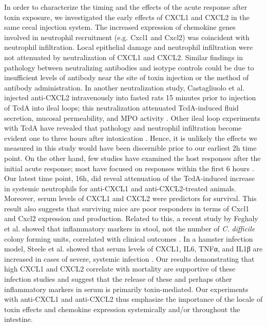 In order to characterize the timing and the effects of the 
acute response after toxin exposure, we investigated the 
early effects of CXCL1 and CXCL2 in the same cecal injection 
system. The increased expression of chemokine genes involved 
in neutrophil recruitment (e.g. Cxcl1 and Cxcl2) was 
coincident with neutrophil infiltration. Local epithelial 
damage and neutrophil infiltration were not attenuated by 
neutralization of CXCL1 and CXCL2. Similar findings in 
pathology between neutralizing antibodies and isotype controls 
could be due to insufficient levels of antibody near the 
site of toxin injection or the method of antibody administration. 
In another neutralization study, Castagliuolo et al. injected 
anti-CXCL2 intravenously into fasted rats 15 minutes prior to 
injection of TcdA into ileal loops; this neutralization attenuated 
TcdA-induced fluid secretion, mucosal permeability, and MPO 
activity \cite{Castagliuolo:1998um}. Other ileal loop experiments 
with TcdA have revealed that pathology and neutrophil infiltration 
become evident one to three hours after intoxication 
\cite{Ishida:2004ta,Castagliuolo:1998um}. Hence, it is unlikely the 
effects we measured in this study would have been discernible prior 
to our earliest 2h time point. On the other hand, few studies have 
examined the host responses after the initial acute response; most 
have focused on responses within the first 6 hours 
\cite{Morteau:2002ts,Kelly:1994cu,Kokkotou:2009ik,Ishida:2004ta,Alcantara:2005dt,Warny:2000ct,Castagliuolo:1994ta}. 
Our latest time point, 16h, did reveal attenuation of the 
TcdA-induced increase in systemic neutrophils for anti-CXCL1 
and anti-CXCL2-treated animals. Moreover, serum levels of 
CXCL1 and CXCL2 were predictors for survival. This result also 
suggests that surviving mice are poor responders in terms of Cxcl1 
and Cxcl2 expression and production. Related to this, a recent 
study by Feghaly et al. showed that inflammatory markers in stool, 
not the number of \textit{C. difficile} colony forming units, 
correlated with clinical outcomes \cite{ElFeghaly:2013gq}. In a 
hamster infection model, Steele et al. showed that serum levels of 
CXCL1, IL6, TNFα, and IL1β are increased in cases of severe, 
systemic infection \cite{Steele:2012ft}. Our results demonstrating 
that high CXCL1 and CXCL2 correlate with mortality are supportive 
of these infection studies and suggest that the release of these 
and perhaps other inflammatory markers in serum is primarily 
toxin-mediated. Our experiments with anti-CXCL1 and anti-CXCL2 
thus emphasize the importance of the locale of toxin effects 
and chemokine expression systemically and/or throughout the intestine.

